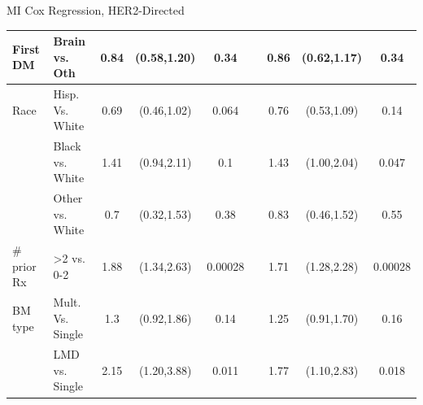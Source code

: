 \begin{frame}{MI Cox Regression, HER2-Directed}
\begin{table}[]
{\begin{tabular}{|l|l|c|c|c|c|c|c|c|}
First DM                       & Brain vs. Oth                    & 0.84                  & (0.58,1.20)                                        & 0.34                  &                       & 0.86 & (0.62,1.17)                                                          & 0.34                                                        \\ \hline
Race                           & Hisp. Vs. White                  & 0.69                  & (0.46,1.02)                                        & 0.064                 &                       & 0.76 & (0.53,1.09)                                                          & 0.14                                                        \\ \hline
                               & Black vs. White                  & 1.41                  & (0.94,2.11)                                        & 0.1                   &                       & 1.43 & (1.00,2.04)                                                          & 0.047                                                       \\ \hline
                               & Other vs. White                  & 0.7                   & (0.32,1.53)                                        & 0.38                  &                       & 0.83 & (0.46,1.52)                                                          & 0.55                                                        \\ \hline
\# prior Rx                    & \textgreater2 vs. 0-2            & 1.88                  & (1.34,2.63)                                        & 0.00028               &                       & 1.71 & (1.28,2.28)                                                          & 0.00028                                                     \\ \hline
BM type                        & Mult. Vs. Single                 & 1.3                   & (0.92,1.86)                                        & 0.14                  &                       & 1.25 & (0.91,1.70)                                                          & 0.16                                                        \\ \hline
                               & LMD vs. Single                   & 2.15                  & (1.20,3.88)                                        & 0.011                 &                       & 1.77 & (1.10,2.83)                                                          & 0.018                                                       \\ \hline

\end{tabular}}
\end{table}
\end{frame}
